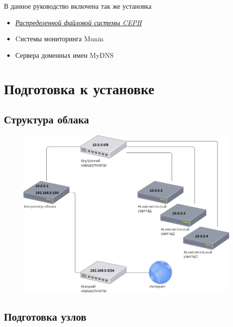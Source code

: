 \documentclass[letterpaper,10pt,russian]{sphinxmanual}
\begin{document}
В данное руководство включена так же установка
\begin{itemize}
\item {} 
{\hyperref[README:link]{\emph{Распределенной файловой системы CEPH}}}

\item {} 
Cистемы мониторинга Munin

\item {} 
Сервера доменных имен MyDNS

\end{itemize}


\chapter{Подготовка к установке}
\label{README:openstack}\label{README:id2}

\section{Структура облака}
\label{README:id3}\begin{figure}[htbp]
\centering

\includegraphics{first.png}
\end{figure}


\section{Подготовка узлов}
\label{README:id4}\begin{figure}[htbp]\begin{flushright}

\end{flushright}\end{figure}
\end{document}
